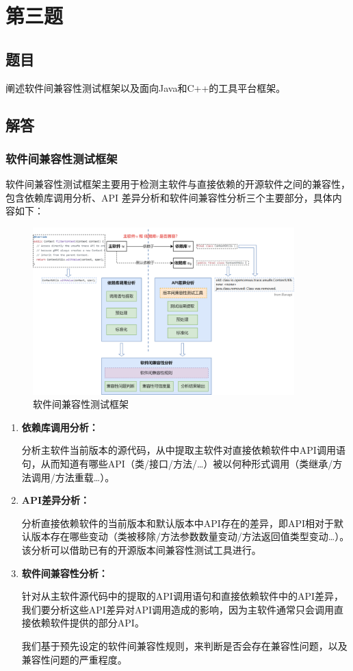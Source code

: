 \documentclass{article}
\begin{document}
\section{第三题}

\subsection{题目}

阐述软件间兼容性测试框架以及面向Java和C++的工具平台框架。

\subsection{解答}

\subsubsection{软件间兼容性测试框架}

软件间兼容性测试框架主要用于检测主软件与直接依赖的开源软件之间的兼容性，包含依赖库调用分析、API 差异分析和软件间兼容性分析三个主要部分，具体内容如下：

\begin{figure}[H]
	\centering
	\includegraphics[width=0.9\textwidth]{img/1.png}
	\caption{软件间兼容性测试框架}
\end{figure}

\begin{enumerate}
	\item
	\textbf{依赖库调用分析：}
	
	分析主软件当前版本的源代码，从中提取主软件对直接依赖软件中API调用语句，从而知道有哪些API（类/接口/方法/…）被以何种形式调用（类继承/方法调用/方法重载…）。
	
	\item
	\textbf{API差异分析：}
	
	分析直接依赖软件的当前版本和默认版本中API存在的差异，即API相对于默认版本存在哪些变动（类被移除/方法参数数量变动/方法返回值类型变动…）。该分析可以借助已有的开源版本间兼容性测试工具进行。
	
	\item 
	\textbf{软件间兼容性分析：}
	
	针对从主软件源代码中的提取的API调用语句和直接依赖软件中的API差异，我们要分析这些API差异对API调用造成的影响，因为主软件通常只会调用直接依赖软件提供的部分API。
	
	我们基于预先设定的软件间兼容性规则，来判断是否会存在兼容性问题，以及兼容性问题的严重程度。
\end{enumerate}
\end{document}
